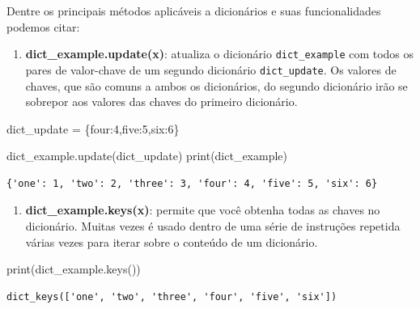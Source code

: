 \documentclass[
  brazilian,
  letterpaper,
  DIV=11,
  numbers=noendperiod]{scrreprt}
\newenvironment{Shaded}{\begin{snugshade}}{\end{snugshade}}
\newcommand{\BuiltInTok}[1]{\textcolor[rgb]{0.00,0.23,0.31}{#1}}
\newcommand{\DecValTok}[1]{\textcolor[rgb]{0.68,0.00,0.00}{#1}}
\newcommand{\NormalTok}[1]{\textcolor[rgb]{0.00,0.23,0.31}{#1}}
\newcommand{\OperatorTok}[1]{\textcolor[rgb]{0.37,0.37,0.37}{#1}}
\newcommand{\StringTok}[1]{\textcolor[rgb]{0.13,0.47,0.30}{#1}}
\providecommand{\tightlist}{%
  \setlength{\itemsep}{0pt}\setlength{\parskip}{0pt}}
\begin{document}
Dentre os principais métodos aplicáveis a dicionários e suas
funcionalidades podemos citar:

\begin{enumerate}
\def\labelenumi{\arabic{enumi}.}
\tightlist
\item
  \textbf{dict\_example.update(x)}: atualiza o dicionário
  \texttt{dict\_example} com todos os pares de valor-chave de um segundo
  dicionário \texttt{dict\_update}. Os valores de chaves, que são comuns
  a ambos os dicionários, do segundo dicionário irão se sobrepor aos
  valores das chaves do primeiro dicionário.
\end{enumerate}

\begin{Shaded}
\begin{Highlighting}[]
\NormalTok{dict\_update }\OperatorTok{=}\NormalTok{ \{}\StringTok{\textquotesingle{}four\textquotesingle{}}\NormalTok{:}\DecValTok{4}\NormalTok{,}\StringTok{\textquotesingle{}five\textquotesingle{}}\NormalTok{:}\DecValTok{5}\NormalTok{,}\StringTok{\textquotesingle{}six\textquotesingle{}}\NormalTok{:}\DecValTok{6}\NormalTok{\}}

\NormalTok{dict\_example.update(dict\_update)}
\BuiltInTok{print}\NormalTok{(dict\_example)}
\end{Highlighting}
\end{Shaded}

\begin{verbatim}
{'one': 1, 'two': 2, 'three': 3, 'four': 4, 'five': 5, 'six': 6}
\end{verbatim}

\begin{enumerate}
\def\labelenumi{\arabic{enumi}.}
\setcounter{enumi}{1}
\tightlist
\item
  \textbf{dict\_example.keys(x)}: permite que você obtenha todas as
  chaves no dicionário. Muitas vezes é usado dentro de uma série de
  instruções repetida várias vezes para iterar sobre o conteúdo de um
  dicionário.
\end{enumerate}

\begin{Shaded}
\begin{Highlighting}[]
\BuiltInTok{print}\NormalTok{(dict\_example.keys())}
\end{Highlighting}
\end{Shaded}

\begin{verbatim}
dict_keys(['one', 'two', 'three', 'four', 'five', 'six'])
\end{verbatim}
\end{document}
